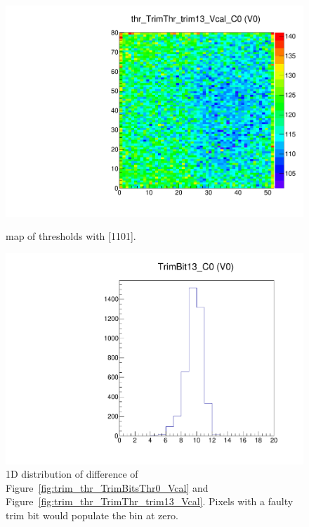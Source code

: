 \begin{figure}[!htp]
\centering
\begin{minipage}{0.45\textwidth}
  \includegraphics[width=1.0\textwidth]{figures/trim_thr_TrimThr_trim13_Vcal.pdf}
  \caption{\roc map of \vcal thresholds with  [1101].}
  \label{fig:trim_thr_TrimThr_trim13_Vcal}
\end{minipage}
\hspace{0.3cm}
\begin{minipage}{0.45\textwidth}
  \includegraphics[width=1.0\textwidth]{figures/trim_TrimBit13.pdf}
  \caption{1D distribution of difference of Figure~\ref{fig:trim_thr_TrimBitsThr0_Vcal} and Figure~\ref{fig:trim_thr_TrimThr_trim13_Vcal}.
           Pixels with a faulty trim bit would populate the bin at zero.}
  \label{fig:trim_TrimBit13}
\end{minipage}
\end{figure}

